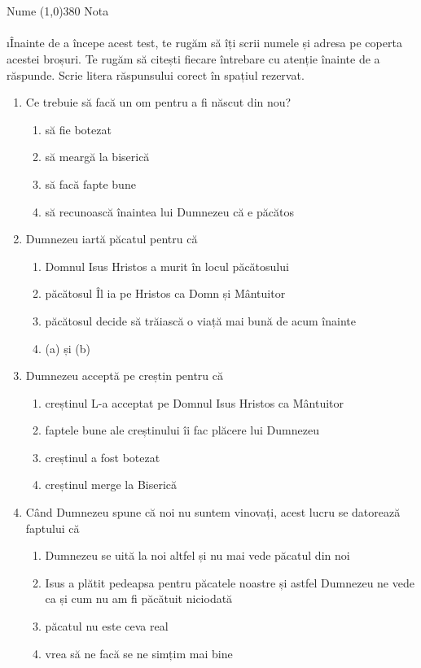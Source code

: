 \\
\\
Nume \line(1,0){380} \hspace{0.3cm} Nota \liniescurta
\\
\\
\noindent \i{Înainte de a începe acest test, te rugăm să îți scrii numele și adresa pe coperta acestei broșuri. Te rugăm să citești fiecare întrebare cu atenție înainte de a răspunde. Scrie litera răspunsului corect în spațiul rezervat.}

\begin{enumerate}[itemsep=19pt]
	\item Ce trebuie să facă un om pentru a fi născut din nou?
		\begin{enumerate}
			\item să fie botezat
			\item să meargă la biserică
			\item să facă fapte bune
			\item să recunoască înaintea lui Dumnezeu că e păcătos
			\liniescurta
		\end{enumerate}
		
	\item Dumnezeu iartă păcatul pentru că
		\begin{enumerate}
			\item Domnul Isus Hristos a murit în locul păcătosului
			\item păcătosul Îl ia pe Hristos ca Domn și Mântuitor
			\item păcătosul decide să trăiască o viață mai bună de acum înainte
			\item (a) și (b)
			\liniescurta
		\end{enumerate}
		
	\item Dumnezeu acceptă pe creștin pentru că
		\begin{enumerate}
			\item creștinul L-a acceptat pe Domnul Isus Hristos ca Mântuitor
			\item faptele bune ale creștinului îi fac plăcere lui Dumnezeu
			\item creștinul a fost botezat
			\item creștinul merge la Biserică
			\liniescurta
		\end{enumerate}
	
	\item Când Dumnezeu spune că noi nu suntem vinovați, acest lucru se datorează faptului că
		\begin{enumerate}
			\item Dumnezeu se uită la noi altfel și nu mai vede păcatul din noi
			\item Isus a plătit pedeapsa pentru păcatele noastre și astfel Dumnezeu ne vede ca și cum nu am fi păcătuit niciodată
			\item păcatul nu este ceva real
			\item vrea să ne facă se ne simțim mai bine
			\liniescurta
		\end{enumerate}
		

\end{enumerate}
